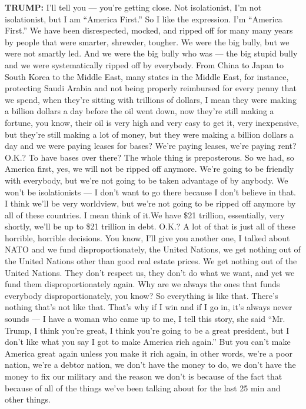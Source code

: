 \textbf{TRUMP:} I'll tell you --- you're getting close. Not
isolationist, I'm not isolationist, but I am ``America First.'' So I
like the expression. I'm ``America First.'' We have been disrespected,
mocked, and ripped off for many many years by people that were smarter,
shrewder, tougher. We were the big bully, but we were not smartly led.
And we were the big bully who was --- the big stupid bully and we were
systematically ripped off by everybody. From China to Japan to South
Korea to the Middle East, many states in the Middle East, for instance,
protecting Saudi Arabia and not being properly reimbursed for every
penny that we spend, when they're sitting with trillions of dollars, I
mean they were making a billion dollars a day before the oil went down,
now they're still making a fortune, you know, their oil is very high and
very easy to get it, very inexpensive, but they're still making a lot of
money, but they were making a billion dollars a day and we were paying
leases for bases? We're paying leases, we're paying rent? O.K.? To have
bases over there? The whole thing is preposterous. So we had, so America
first, yes, we will not be ripped off anymore. We're going to be
friendly with everybody, but we're not going to be taken advantage of by
anybody. We won't be isolationists --- I don't want to go there because
I don't believe in that. I think we'll be very worldview, but we're not
going to be ripped off anymore by all of these countries. I mean think
of it.We have \$21 trillion, essentially, very shortly, we'll be up to
\$21 trillion in debt. O.K.? A lot of that is just all of these
horrible, horrible decisions. You know, I'll give you another one, I
talked about NATO and we fund disproportionately, the United Nations, we
get nothing out of the United Nations other than good real estate
prices. We get nothing out of the United Nations. They don't respect us,
they don't do what we want, and yet we fund them disproportionately
again. Why are we always the ones that funds everybody
disproportionately, you know? So everything is like that. There's
nothing that's not like that. That's why if I win and if I go in, it's
always never sounds --- I have a woman who came up to me, I tell this
story, she said ``Mr. Trump, I think you're great, I think you're going
to be a great president, but I don't like what you say I got to make
America rich again.'' But you can't make America great again unless you
make it rich again, in other words, we're a poor nation, we're a debtor
nation, we don't have the money to do, we don't have the money to fix
our military and the reason we don't is because of the fact that because
of all of the things we've been talking about for the last 25 min and
other things.


